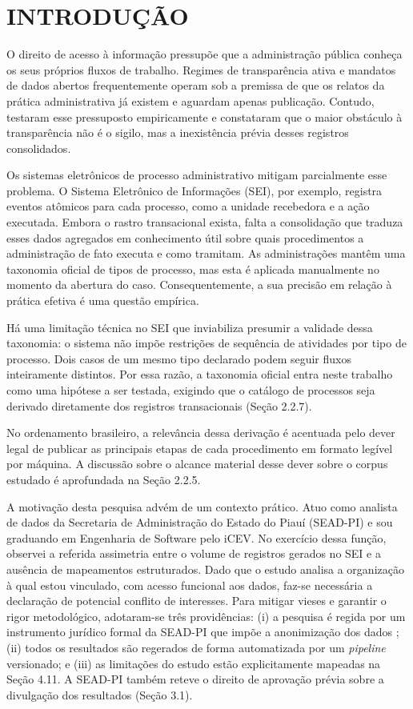 \section{INTRODUÇÃO}

O direito de acesso à informação pressupõe que a administração pública conheça os seus próprios fluxos de trabalho. Regimes de transparência ativa e mandatos de dados abertos frequentemente operam sob a premissa de que os relatos da prática administrativa já existem e aguardam apenas publicação. Contudo,  testaram esse pressuposto empiricamente e constataram que o maior obstáculo à transparência não é o sigilo, mas a inexistência prévia desses registros consolidados.

Os sistemas eletrônicos de processo administrativo mitigam parcialmente esse problema. O Sistema Eletrônico de Informações (SEI), por exemplo, registra eventos atômicos para cada processo, como a unidade recebedora e a ação executada. Embora o rastro transacional exista, falta a consolidação que traduza esses dados agregados em conhecimento útil sobre quais procedimentos a administração de fato executa e como tramitam. As administrações mantêm uma taxonomia oficial de tipos de processo, mas esta é aplicada manualmente no momento da abertura do caso. Consequentemente, a sua precisão em relação à prática efetiva é uma questão empírica. 

Há uma limitação técnica no SEI que inviabiliza presumir a validade dessa taxonomia: o sistema não impõe restrições de sequência de atividades por tipo de processo. Dois casos de um mesmo tipo declarado podem seguir fluxos inteiramente distintos. Por essa razão, a taxonomia oficial entra neste trabalho como uma hipótese a ser testada, exigindo que o catálogo de processos seja derivado diretamente dos registros transacionais (Seção 2.2.7).

No ordenamento brasileiro, a relevância dessa derivação é acentuada pelo dever legal de publicar as principais etapas de cada procedimento em formato legível por máquina. A discussão sobre o alcance material desse dever sobre o corpus estudado é aprofundada na Seção 2.2.5.

A motivação desta pesquisa advém de um contexto prático. Atuo como analista de dados da Secretaria de Administração do Estado do Piauí (SEAD-PI) e sou graduando em Engenharia de Software pelo iCEV. No exercício dessa função, observei a referida assimetria entre o volume de registros gerados no SEI e a ausência de mapeamentos estruturados. Dado que o estudo analisa a organização à qual estou vinculado, com acesso funcional aos dados, faz-se necessária a declaração de potencial conflito de interesses. Para mitigar vieses e garantir o rigor metodológico, adotaram-se três providências: (i) a pesquisa é regida por um instrumento jurídico formal da SEAD-PI que impõe a anonimização dos dados \cite{seadpi2026termo}; (ii) todos os resultados são regerados de forma automatizada por um \emph{pipeline} versionado; e (iii) as limitações do estudo estão explicitamente mapeadas na Seção 4.11. A SEAD-PI também reteve o direito de aprovação prévia sobre a divulgação dos resultados (Seção 3.1).

